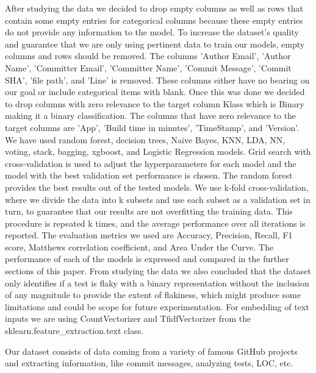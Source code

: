 \documentclass[sigconf,review]{acmart}
\begin{document}
After studying the data we decided to drop empty columns as well as rows that contain some empty entries for categorical columns because these empty entries do not provide any information to the model. To increase the dataset's quality and guarantee that we are only using pertinent data to train our models, empty columns and rows should be removed. The columns 'Author Email', 'Author Name', 'Committer Email', 'Committer Name', 'Commit Message', 'Commit SHA', 'file path', and 'Line' is removed. These columns either have no bearing on our goal or include categorical items with blank. Once this was done we decided to drop columns with zero relevance to the target column Klass which is Binary making it a binary classification. The columns that have zero relevance to the target columns are 'App', 'Build time in minutes', 'TimeStamp', and 'Version'. We have used random forest, decision trees, Naive Bayes, KNN, LDA, NN, voting, stack, bagging, xgboost, and Logistic Regression models. Grid search with cross-validation is used to adjust the hyperparameters for each model and the model with the best validation set performance is chosen. The random forest provides the best results out of the tested models. We use k-fold cross-validation, where we divide the data into k subsets and use each subset as a validation set in turn, to guarantee that our results are not overfitting the training data. This procedure is repeated k times, and the average performance over all iterations is reported. The evaluation metrics we used are Accuracy, Precision, Recall, F1 score, Matthews correlation coefficient, and Area Under the Curve.
The performance of each of the models is expressed and compared in the further sections of this paper. From studying the data we also concluded that the dataset only identifies if a test is flaky with a binary representation without the inclusion of any magnitude to provide the extent of flakiness, which might produce some limitations and could be scope for future experimentation.
For embedding of text inputs we are using CountVectorizer and TfidfVectorizer from the sklearn.feature\_extraction.text class.

Our dataset consists of data coming from a variety of famous GitHub projects and extracting information, like commit messages, analyzing tests, LOC, etc.
\end{document}
